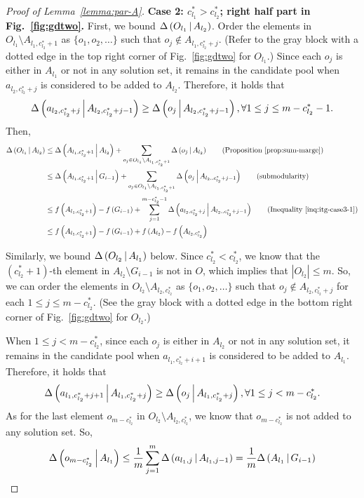 \begin{proof}[Proof of Lemma~\ref{lemma:par-A}]
\textbf{Case 2: $c_{l_1}^* > c_{l_2}^*$; right half part in Fig.~\ref{fig:gdtwo}.}
First, we bound $\Delta \left( O_{l_1} \, \middle| \, A_{l_2} \right)$.
Order the elements in $O_{l_1}\setminus A_{l_1, c_{l_2}^*+1}$ as $\{o_1, o_2, \ldots\}$ such that $o_j \not \in A_{l_1, c_{l_2}^*+j}$.
(Refer to the gray block with a dotted edge in the top right corner of Fig.~\ref{fig:gdtwo} for $O_{l_1}$.)
Since each $o_j$ is either in $A_{l_1}$ or not in any solution set,
it remains in the candidate pool when $a_{l_2, c_{l_2}^*+j}$ is considered to be added to $A_{l_2}$.
Therefore, it holds that 
\begin{equation}\label{inq:itg-case3-1}
\Delta \left( a_{l_2, c_{l_2}^*+j} \, \middle| \, A_{l_2, c_{l_2}^*+j-1} \right) \ge \Delta \left( o_j \, \middle| \, A_{l_2, c_{l_2}^*+j-1} \right), \forall 1\le j\le m-c_{l_2}^*-1.
\end{equation}
Then,
\begin{align*}
\marge{O_{l_1}}{A_{l_2}} &\le \marge{A_{l_1, c_{l_2}^*+1}}{A_{l_2}}  + \sum_{o_j \in O_{l_1}\setminus A_{l_1, c_{l_2}^*+1}}\marge{o_j}{A_{l_2}} \tag{Proposition~\ref{prop:sum-marge}}\\
&\le \marge{A_{l_1, c_{l_2}^*+1}}{G_{i-1}} + \sum_{o_j \in O_{l_1}\setminus A_{l_1, c_{l_2}^*+1}}\marge{o_j}{A_{l_2, , c_{l_2}^*+j-1}} \tag{submodularity}\\
&\le \ff{A_{l_1, c_{l_2}^*+1}}-\ff{G_{i-1}} + \sum_{j = 1}^{m-c_{l_2}^*-1}\marge{a_{l_2, c_{l_2}^*+j}}{A_{l_2, , c_{l_2}^*+j-1}} \tag{Inequality~\eqref{inq:itg-case3-1}}\\
& \le \ff{A_{l_1, c_{l_2}^*+1}}-\ff{G_{i-1}} + \ff{A_{l_2}} - \ff{A_{l_2, c_{l_2}^*}} 
\end{align*}

Similarly, we bound $\Delta \left( O_{l_2} \, \middle| \, A_{l_1} \right)$ below.
Since $c_{l_2}^* < c_{l_2}^*$,
we know that the $(c_{l_2}^*+1)$-th element in $A_{l_2}\setminus G_{i-1}$
is not in $O$, which implies that $|O_{l_2}| \le m$.
So, we can order the elements in $O_{l_2}\setminus A_{l_2, c_{l_2}^*}$ as $\{o_1, o_2, \ldots\}$
such that $o_j \not \in A_{l_2, c_{l_2}^* + j}$ for each $1\le j\le m-c_{l_2}^*$.
(See the gray block with a dotted edge in the bottom right corner of Fig.~\ref{fig:gdtwo} for $O_{l_2}$.)

When $1\le j< m-c_{l_2}^*$,
since each $o_j$ is either in $A_{l_2}$ or not in any solution set,
it remains in the candidate pool when $a_{l_1, c_{l_2}^*+i+1}$ is considered to be added to $A_{l_1}$.
Therefore, it holds that
\begin{equation}
\Delta \left( a_{l_1, c_{l_2}^*+j+1} \, \middle| \, A_{l_1, c_{l_2}^*+j} \right) \ge \Delta \left( o_j \, \middle| \, A_{l_1, c_{l_2}^*+j} \right), \forall 1\le j< m-c_{l_2}^*.
\end{equation}
As for the last element $o_{m-c_{l_2}^*}$ in $O_{l_2}\setminus A_{l_2, c_{l_2}^*}$,
we know that $o_{m-c_{l_2}^*}$ is not added to any solution set.
So,
\begin{equation}
\Delta \left( o_{m-c_{l_2}^*} \, \middle| \, A_{l_1} \right) \le \frac{1}{m}\sum_{j = 1}^m \Delta \left( a_{l_1, j} \, \middle| \, A_{l_1,j-1} \right)
 = \frac{1}{m} \Delta \left( A_{l_1} \, \middle| \, G_{i-1} \right)
\end{equation}


\end{proof}
